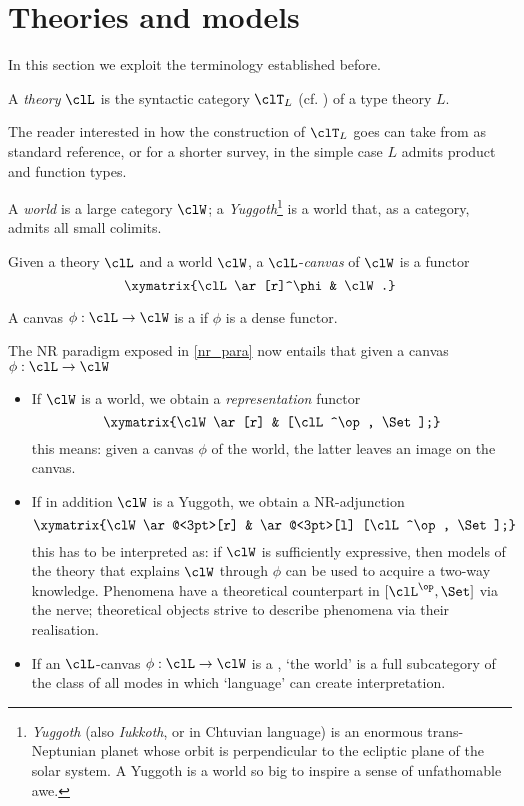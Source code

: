 \section{Theories and models}\label{sec_4_theories}
\label{sec:orge02f333}
In this section we exploit the terminology established before.
\begin{definition}[Theory]\label{teoria}
	A \emph{theory} $\clL$ is the syntactic category $\clT_L$ (cf. \cite[II.11]{lambek1988introduction}) of a type theory $L$.
\end{definition}
The reader interested in how the construction of $\clT_L$ goes can take from \cite{lambek1988introduction} as standard reference, or \cite{abramskyno} for a shorter survey, in the simple case $L$ admits product and function types.
\begin{definition}\label{mondo_yalda}
	A \emph{world} is a large category $\clW$; a \emph{Yuggoth}\footnote{\emph{Yuggoth} (also \emph{Iukkoth}, or {\yugg} in Chtuvian language) is an enormous trans-Neptunian planet whose orbit is perpendicular to the ecliptic plane of the solar system. A Yuggoth is a world so big to inspire a sense of unfathomable awe.} is a world that, as a category, admits all small colimits.
\end{definition}
\begin{definition}\label{canvas_scienza}
	Given a theory $\clL$ and a world $\clW$, a $\clL$-\emph{canvas} of $\clW$ is a functor
	\[\xymatrix{\clL \ar[r]^\phi & \clW.}\]

	A canvas $\phi : \clL \to \clW$ is a \emph{\science} if $\phi$ is a dense functor.
\end{definition}
\begin{remark}\label{remark_yuggoth_1}
	The NR paradigm exposed in \autoref{nr_para} now entails that given a canvas $\phi : \clL \to \clW$
	\begin{itemize}
		\item If $\clW$ is a world, we obtain a \emph{representation} functor
		      \[ \xymatrix{\clW \ar[r] & [\clL^\op, \Set];} \label{mvndvs}\]
		      this means: given a canvas $\phi$ of the world, the latter leaves an image on the canvas.
		\item If in addition $\clW$ is a Yuggoth, we obtain a NR-adjunction
		      \[\xymatrix{\clW \ar@<3pt>[r] & \ar@<3pt>[l] [\clL^\op, \Set];}\]
		      this has to be interpreted as: if $\clW$ is sufficiently expressive, then models of the theory that explains $\clW$ through $\phi$ can be used to acquire a two-way knowledge. Phenomena have a theoretical counterpart in $[\clL^\op,\Set]$ via the nerve; theoretical objects strive to describe phenomena via their realisation.
		\item If an $\clL$-canvas $\phi : \clL \to \clW$ is a \science, `the world' is a full subcategory of the class of all modes in which `language' can create interpretation.
	\end{itemize}
\end{remark}
